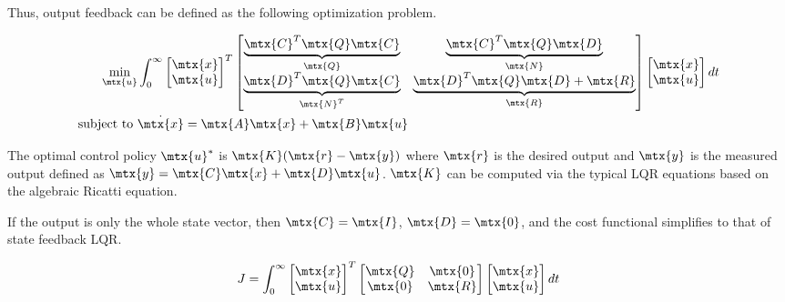 Thus, output feedback can be defined as the following optimization problem.

\begin{theorem}
  \begin{align}
    \min_{\mtx{u}} &\int_0^\infty
    \begin{bmatrix}
      \mtx{x} \\
      \mtx{u}
    \end{bmatrix}^T
    \begin{bmatrix}
      \underbrace{\mtx{C}^T\mtx{Q}\mtx{C}}_{\mtx{Q}} &
      \underbrace{\mtx{C}^T\mtx{Q}\mtx{D}}_{\mtx{N}} \\
      \underbrace{\mtx{D}^T\mtx{Q}\mtx{C}}_{\mtx{N}^T} &
      \underbrace{\mtx{D}^T\mtx{Q}\mtx{D} + \mtx{R}}_{\mtx{R}}
    \end{bmatrix}
    \begin{bmatrix}
      \mtx{x} \\
      \mtx{u}
    \end{bmatrix}
    dt \nonumber \\
    \text{subject to } &\dot{\mtx{x}} = \mtx{A}\mtx{x} + \mtx{B}\mtx{u}
  \end{align}

  The optimal control policy $\mtx{u}^*$ is $\mtx{K}(\mtx{r} - \mtx{y})$ where
  $\mtx{r}$ is the desired output and $\mtx{y}$ is the measured output defined
  as $\mtx{y} = \mtx{C}\mtx{x} + \mtx{D}\mtx{u}$. $\mtx{K}$ can be computed via
  the typical LQR equations based on the algebraic Ricatti equation.
\end{theorem}

If the output is only the whole state vector, then $\mtx{C} = \mtx{I}$,
$\mtx{D} = \mtx{0}$, and the cost functional simplifies to that of state
feedback LQR.

\begin{equation*}
  J = \int_0^\infty
  \begin{bmatrix}
    \mtx{x} \\
    \mtx{u}
  \end{bmatrix}^T
  \begin{bmatrix}
    \mtx{Q} & \mtx{0} \\
    \mtx{0} & \mtx{R}
  \end{bmatrix}
  \begin{bmatrix}
    \mtx{x} \\
    \mtx{u}
  \end{bmatrix}
  dt
\end{equation*}
